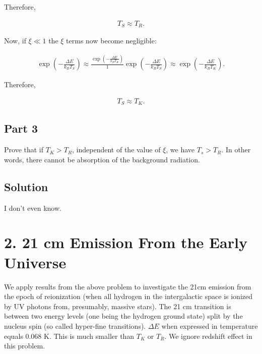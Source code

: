 \documentclass[12pt]{article}
\begin{document}
Therefore,

\begin{align*}
T_S \approx T_R.
\end{align*}

Now, if $\xi \ll 1$ the $\xi$ terms now become negligible:

\begin{equation*}
\begin{split}
\exp\left(-\frac{\Delta E}{k_BT_S}\right) \approx \frac{\exp\left(-\frac{\Delta E}{k_BT_K}\right)}{1}
\exp\left(-\frac{\Delta E}{k_BT_S}\right) \approx \exp\left(-\frac{\Delta E}{k_BT_K}\right).
\end{split}
\end{equation*}

Therefore,

\begin{align*}
T_S \approx T_K.
\end{align*}


\subsection*{Part 3}

Prove that if $T_K > T_R$, independent of the value of $\xi$, we have $T_s > T_R$. In other words, there cannot be absorption of the background radiation.


\subsection*{Solution}

I don't even know.


\section*{2. 21 cm Emission From the Early Universe}

We apply results from the above problem to investigate the 21cm emission from the epoch of reionization (when all hydrogen in the intergalactic space is ionized by UV photons from, presumably, massive stars). The 21 cm transition is between two energy levels (one being the hydrogen ground state) split by the nucleus spin (so called hyper-fine transitions). $\Delta E$ when expressed in temperature equals 0.068 K. This is much smaller than $T_K$ or $T_R$. We ignore redshift effect in this problem.
\end{document}
